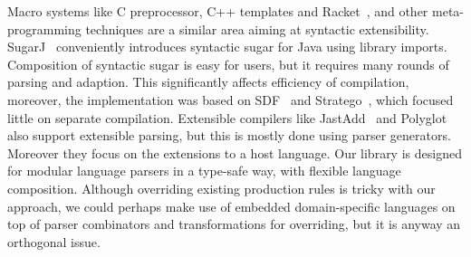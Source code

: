 Macro systems like C preprocessor, C++ templates and
Racket~\cite{Tobin-Hochstadt2011}, and other meta-programming
techniques are a similar area aiming at syntactic extensibility.
SugarJ~\cite{Erdweg2011} conveniently introduces syntactic sugar
for Java using library imports. Composition of syntactic
sugar is easy for users, but it requires many rounds of parsing
and adaption. This significantly affects efficiency of compilation,
moreover, the implementation was based on SDF~\cite{Heering1989} and
Stratego~\cite{Visser2001}, which focused little on separate
compilation.
Extensible compilers like JastAdd~\cite{Ekman2007} and
Polyglot~\cite{Nystrom2003} also support extensible parsing, but this
is mostly done using parser generators. Moreover
they focus on the extensions to a host language. Our library
is designed for modular language parsers in a type-safe way, with
flexible language composition. Although overriding existing production
rules is tricky with our approach, we could perhaps make use of
embedded domain-specific languages on top of parser combinators and
transformations for overriding, but it is anyway an orthogonal issue.
  
  

